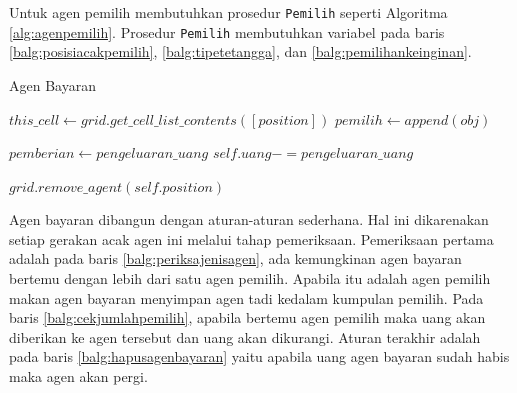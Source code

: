 Untuk agen pemilih membutuhkan prosedur \texttt{Pemilih} seperti Algoritma \ref{alg:agenpemilih}. Prosedur \texttt{Pemilih} membutuhkan variabel pada baris \ref{balg:posisiacakpemilih}, \ref{balg:tipetetangga}, dan \ref{balg:pemilihankeinginan}.

\begin{algorithm}[H]
	\caption{Agen Bayaran}\label{alg:agenbayaran}
	\begin{algorithmic}[1]
			\State $this\_cell \gets grid.get\_cell\_list\_contents([position])$
				\label{balg:periksajenisagen}
					\State $pemilih \gets append(obj)$
				\EndIf

				\label{balg:cekjumlahpemilih}
					\State $pemberian \gets pengeluaran\_uang$
					\State $self.uang -= pengeluaran\_uang$
				\EndIf

				\label{balg:hapusagenbayaran}
					\State $grid.remove\_agent(self.position)$
				\EndIf
			\EndWhile
		\EndProcedure
	\end{algorithmic}
\end{algorithm}

Agen bayaran dibangun dengan aturan-aturan sederhana. Hal ini dikarenakan setiap gerakan acak agen ini melalui tahap pemeriksaan. Pemeriksaan pertama adalah pada baris \ref{balg:periksajenisagen}, ada kemungkinan agen bayaran bertemu dengan lebih dari satu agen pemilih. Apabila itu adalah agen pemilih makan agen bayaran menyimpan agen tadi kedalam kumpulan pemilih. Pada baris \ref{balg:cekjumlahpemilih}, apabila bertemu agen pemilih maka uang akan diberikan ke agen tersebut dan uang akan dikurangi. Aturan terakhir adalah pada baris \ref{balg:hapusagenbayaran} yaitu apabila uang agen bayaran sudah habis maka agen akan pergi.

